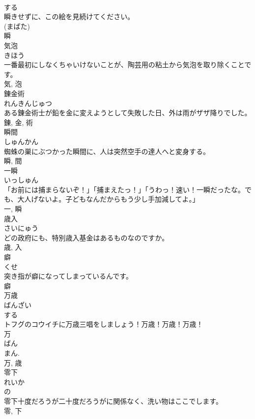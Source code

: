 \documentclass[8pt]{extreport}
\begin{document}
\begin{CJK}{UTF8}{min}
\\	する 
\\	瞬きせずに、この絵を見続けてください。	
\\	(まばた) 
\\	瞬	
\\	気泡	
\\	きほう	
\\	一番最初にしなくちゃいけないことが、陶芸用の粘土から気泡を取り除くことです。	
\\	気, 泡	
\\	錬金術	
\\	れんきんじゅつ	
\\	ある錬金術士が鉛を金に変えようとして失敗した日、外は雨がザザ降りでした。	
\\	錬, 金, 術	
\\	瞬間	
\\	しゅんかん	
\\	蜘蛛の巣にぶつかった瞬間に、人は突然空手の達人へと変身する。	
\\	瞬, 間	
\\	一瞬	
\\	いっしゅん	
\\	「お前には捕まらないぞ！」「捕まえたっ！」「うわっ！速い！一瞬だったな。でも、大人げないよ。子どもなんだからもう少し手加減してよ。」	
\\	一, 瞬	
\\	歳入	
\\	さいにゅう	
\\	どの政府にも、特別歳入基金はあるものなのですか。	
\\	歳, 入	
\\	癖	
\\	くせ	
\\	突き指が癖になってしまっているんです。	
\\	癖	
\\	万歳	
\\	ばんざい	
\\	する 
\\	トフグのコウイチに万歳三唱をしましょう！万歳！万歳！万歳！	
\\	万
\\	ばん 
\\	まん. 
\\	万, 歳	
\\	零下	
\\	れいか	
\\	の 
\\	零下十度だろうが二十度だろうがに関係なく、洗い物はここでします。	
\\	零, 下	

\end{CJK}
\end{document}
